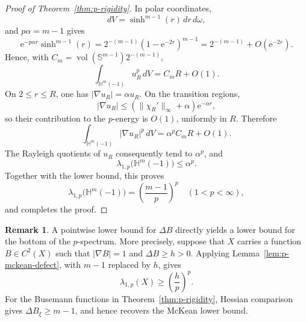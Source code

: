 \documentclass[12pt]{amsart}
\theoremstyle{definition}
\newtheorem{remark}[theorem]{Remark}
\numberwithin{equation}{section}
\newcommand{\ee}{{\mathrm{e}}}
\newcommand{\bH}{\mathbb{H}}
\newcommand{\vol}{\operatorname{vol}}
\begin{document}
\begin{proof}[Proof of Theorem~\ref{thm:p-rigidity}]
In polar coordinates,
\[
  dV=\sinh^{m-1}(r)\,dr\,d\omega,
\]
and \(p\alpha=m-1\) gives
\[
  \ee^{-p\alpha r}\sinh^{m-1}(r)
  =
  2^{-(m-1)}(1-\ee^{-2r})^{m-1}
  =
  2^{-(m-1)}+O(\ee^{-2r}).
\]
Hence, with
\(C_m=\vol(\mathbb S^{m-1})2^{-(m-1)}\),
\[
  \int_{\bH^m(-1)}u_R^p\,dV=C_mR+O(1).
\]
On \(2\leq r\leq R\), one has
\(|\nabla u_R|=\alpha u_R\).  On the transition regions,
\[
  |\nabla u_R|
  \leq(\|\chi_R'\|_\infty+\alpha)\ee^{-\alpha r},
\]
so their contribution to the \(p\)-energy is \(O(1)\), uniformly in
\(R\).  Therefore
\[
  \int_{\bH^m(-1)}|\nabla u_R|^p\,dV
  =\alpha^pC_mR+O(1).
\]
The Rayleigh quotients of \(u_R\) consequently tend to \(\alpha^p\), and
\[
  \lambda_{1,p}\bigl(\bH^m(-1)\bigr)\leq\alpha^p.
\]
Together with the lower bound, this proves
\[
  \lambda_{1,p}\bigl(\bH^m(-1)\bigr)
  =\left(\frac{m-1}{p}\right)^p
  \quad(1<p<\infty),
\]
and completes the proof.
\end{proof}

\begin{remark}\label{rem:p-spectrum-busemann}
A pointwise lower bound for \(\Delta B\) directly yields a lower bound
for the bottom of the \(p\)-spectrum.  More precisely, suppose that
\(X\) carries a function \(B\in C^2(X)\) such that \(|\nabla B|=1\)
and \(\Delta B\geq h>0\).  Applying
Lemma~\ref{lem:p-mckean-defect}, with \(m-1\) replaced by \(h\), gives
\[
  \lambda_{1,p}(X)\geq\left(\frac hp\right)^p.
\]
For the Busemann functions in Theorem~\ref{thm:p-rigidity},
Hessian comparison gives \(\Delta B_\xi\geq m-1\), and hence recovers
the McKean lower bound.
\end{remark}

\begin{bibdiv}
\begin{biblist}
\end{biblist}
\end{bibdiv}
\end{document}
